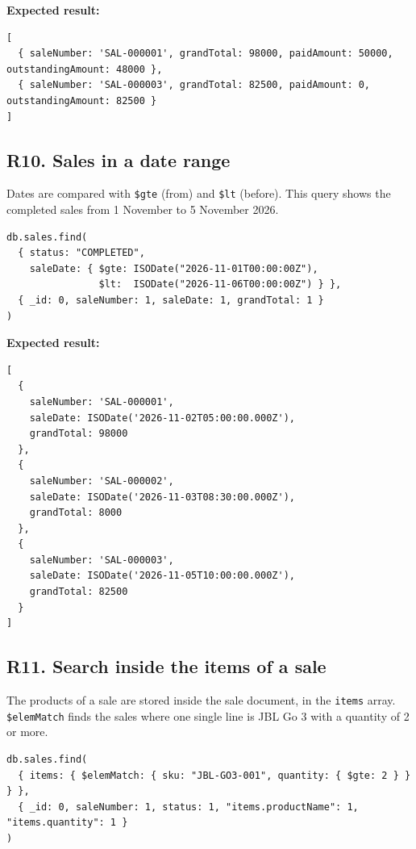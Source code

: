 \documentclass[11pt,a4paper]{article}
\newcommand{\code}[1]{\texttt{#1}}
\begin{document}
\noindent\textbf{Expected result:}
\begin{lstlisting}[style=result]
[
  { saleNumber: 'SAL-000001', grandTotal: 98000, paidAmount: 50000, outstandingAmount: 48000 },
  { saleNumber: 'SAL-000003', grandTotal: 82500, paidAmount: 0, outstandingAmount: 82500 }
]
\end{lstlisting}

\subsection*{R10. Sales in a date range}
Dates are compared with \code{\$gte} (from) and \code{\$lt} (before). This query shows the completed sales from 1 November to 5 November 2026.

\begin{minipage}{\linewidth}
\begin{lstlisting}[style=query]
db.sales.find(
  { status: "COMPLETED",
    saleDate: { $gte: ISODate("2026-11-01T00:00:00Z"),
                $lt:  ISODate("2026-11-06T00:00:00Z") } },
  { _id: 0, saleNumber: 1, saleDate: 1, grandTotal: 1 }
)
\end{lstlisting}
\end{minipage}

\noindent\textbf{Expected result:}
\begin{lstlisting}[style=result]
[
  {
    saleNumber: 'SAL-000001',
    saleDate: ISODate('2026-11-02T05:00:00.000Z'),
    grandTotal: 98000
  },
  {
    saleNumber: 'SAL-000002',
    saleDate: ISODate('2026-11-03T08:30:00.000Z'),
    grandTotal: 8000
  },
  {
    saleNumber: 'SAL-000003',
    saleDate: ISODate('2026-11-05T10:00:00.000Z'),
    grandTotal: 82500
  }
]
\end{lstlisting}

\subsection*{R11. Search inside the items of a sale}
The products of a sale are stored inside the sale document, in the \code{items} array. \code{\$elemMatch} finds the sales where one single line is JBL Go 3 with a quantity of 2 or more.

\begin{minipage}{\linewidth}
\begin{lstlisting}[style=query]
db.sales.find(
  { items: { $elemMatch: { sku: "JBL-GO3-001", quantity: { $gte: 2 } } } },
  { _id: 0, saleNumber: 1, status: 1, "items.productName": 1, "items.quantity": 1 }
)
\end{lstlisting}
\end{minipage}
\end{document}
